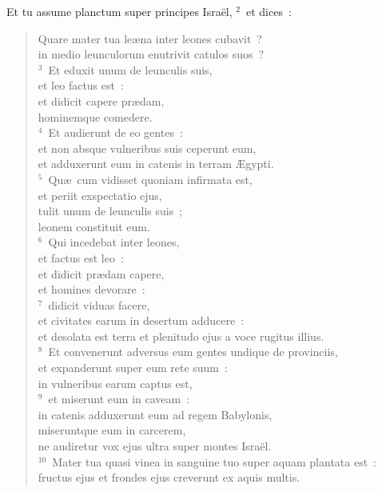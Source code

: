 \bchapter
\lettrine[lines=3,image=true,loversize=0.05,lraise=-0.03]{E}{}t tu assume planctum super principes Isra\"el,
${}^{2}$~et dices~: \begin{flushleft}\begin{verse}Quare mater tua le\ae na inter leones cubavit~?\\ in medio leunculorum enutrivit catulos suos~?\\
${}^{3}$~Et eduxit unum de leunculis suis,\\ et leo factus est~:\\ et didicit capere pr\ae dam,\\ hominemque comedere.\\
${}^{4}$~Et audierunt de eo gentes~:\\ et non absque vulneribus suis ceperunt eum,\\ et adduxerunt eum in catenis in terram \AE gypti.\\
${}^{5}$~Qu\ae\ cum vidisset quoniam infirmata est,\\ et periit exspectatio ejus,\\ tulit unum de leunculis suis~;\\ leonem constituit eum.\\
${}^{6}$~Qui incedebat inter leones,\\ et factus est leo~:\\ et didicit pr\ae dam capere,\\ et homines devorare~:\\
${}^{7}$~didicit viduas facere,\\ et civitates earum in desertum adducere~:\\ et desolata est terra et plenitudo ejus a voce rugitus illius.\\
${}^{8}$~Et convenerunt adversus eum gentes undique de provinciis,\\ et expanderunt super eum rete suum~:\\ in vulneribus earum captus est,\\
${}^{9}$~et miserunt eum in caveam~:\\ in catenis adduxerunt eum ad regem Babylonis,\\ miseruntque eum in carcerem,\\ ne audiretur vox ejus ultra super montes Isra\"el.\\
${}^{10}$~Mater tua quasi vinea in sanguine tuo super aquam plantata est~:\\ fructus ejus et frondes ejus creverunt ex aquis multis.\\

\end{verse}
\end{flushleft}
